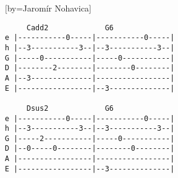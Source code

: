 \begin{figure}[h!]

\end{figure}

[by={Jaromír Nohavica}]

\begin{verbatim}
     Cadd2             G6              
e |-----------0-----|-----------0-----| 
h |--3-----------3--|--3-----------3--| 
G |-----0-----------|-----0-----------| 
D |--------2--------|--------0--------| 
A |--3--------------|-----------------| 
E |-----------------|--3--------------|

     Dsus2             G6 
e |-----------0-----|-----------0-----|  
h |--3-----------3--|--3-----------3--|
G |-----2-----------|-----0-----------|
D |--0-----0--------|--------0--------|
A |-----------------|-----------------|
E |-----------------|--3--------------|

\end{verbatim}

